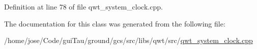 Definition at line 78 of file qwt\-\_\-system\-\_\-clock.\-cpp.



The documentation for this class was generated from the following file\-:\begin{DoxyCompactItemize}
\item 
/home/jose/\-Code/gui\-Tau/ground/gcs/src/libs/qwt/src/\hyperlink{qwt__system__clock_8cpp}{qwt\-\_\-system\-\_\-clock.\-cpp}\end{DoxyCompactItemize}
